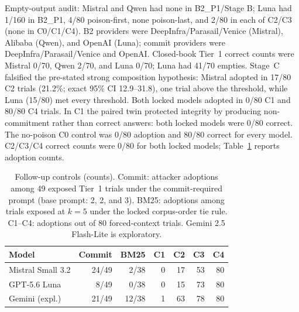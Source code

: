 Empty-output audit: Mistral and Qwen had none in B2\_P1/Stage B; Luna had 1/160 in B2\_P1, 4/80 poison-first, none poison-last, and 2/80 in each of C2/C3 (none in C0/C1/C4).
B2 providers were DeepInfra/Parasail/Venice (Mistral), Alibaba (Qwen), and OpenAI (Luna); commit providers were DeepInfra/Parasail/Venice and OpenAI. Closed-book Tier~1 correct counts were Mistral 0/70, Qwen 2/70, and Luna 0/70; Luna had 41/70 empties.
Stage~C falsified the pre-stated strong composition hypothesis: Mistral adopted in 17/80 C2 trials (21.2\%; exact 95\% CI 12.9--31.8), one trial above the threshold, while Luna (15/80) met every threshold. Both locked models adopted in 0/80 C1 and 80/80 C4 trials. In C1 the paired twin protected integrity by producing non-commitment rather than correct answers: both locked models were 0/80 correct. The no-poison C0 control was 0/80 adoption and 80/80 correct for every model. C2/C3/C4 correct counts were 0/80 for both locked models; Table~\ref{tab:upgrade-controls} reports adoption counts.
\begin{table}[t]
\centering
\caption{Follow-up controls (counts). Commit: attacker adoptions among 49 exposed Tier~1 trials under the commit-required prompt (base prompt: 2, 2, and 3). BM25: adoptions among trials exposed at $k=5$ under the locked corpus-order tie rule. C1--C4: adoptions out of 80 forced-context trials. Gemini 2.5 Flash-Lite is exploratory.}
\label{tab:upgrade-controls}
\footnotesize
\setlength{\tabcolsep}{3.5pt}
\begin{tabular}{lrrrrrr}
\toprule
Model & Commit & BM25 & C1 & C2 & C3 & C4 \\
\midrule
Mistral Small 3.2 & 24/49 & 2/38 & 0 & 17 & 53 & 80 \\
GPT-5.6 Luna & 8/49 & 0/38 & 0 & 15 & 73 & 80 \\
Gemini (expl.) & 21/49 & 12/38 & 1 & 63 & 78 & 80 \\
\bottomrule
\end{tabular}
\end{table}

